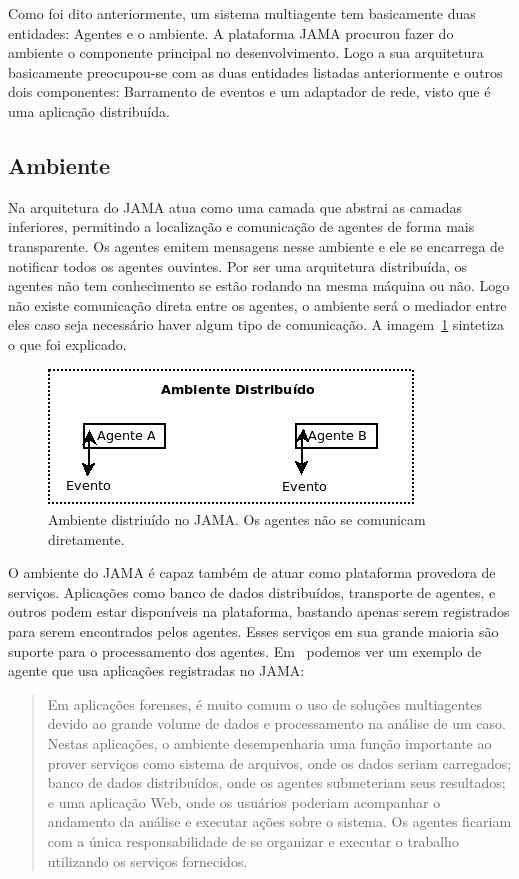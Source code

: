 Como foi dito anteriormente, um sistema multiagente tem basicamente duas entidades: Agentes e o ambiente. A plataforma JAMA procurou fazer do ambiente o componente principal no desenvolvimento. Logo a sua arquitetura basicamente preocupou-se com as duas entidades listadas anteriormente e outros dois componentes: Barramento de eventos e um adaptador de rede, visto que é uma aplicação distribuída.

\subsection{Ambiente}

Na arquitetura do JAMA atua como uma camada que abstrai as camadas inferiores, permitindo a localização e comunicação de agentes de forma mais transparente. Os agentes emitem mensagens nesse ambiente e ele se encarrega de notificar todos os agentes ouvintes. Por ser uma arquitetura distribuída, os agentes não tem conhecimento se estão rodando na mesma máquina ou não. Logo não existe comunicação direta entre os agentes, o ambiente será o mediador entre eles caso seja necessário haver algum tipo de comunicação. A imagem~\ref{fig:ambiente} sintetiza o que foi explicado.

\begin{figure}
	\centering
	\includegraphics[scale=0.75]{images/ambiente.png}
	\caption{Ambiente distriuído no JAMA. Os agentes não se comunicam diretamente.}
	\label{fig:ambiente}
\end{figure}

O ambiente do JAMA é capaz também de atuar como plataforma provedora de serviços. Aplicações como banco de dados distribuídos, transporte de agentes, e outros podem estar disponíveis na plataforma, bastando apenas serem registrados para serem encontrados pelos agentes. Esses serviços em sua grande maioria são suporte para o processamento dos agentes. Em~\cite{parise11} podemos ver um exemplo de agente que usa aplicações registradas no JAMA:

\begin{quote}
Em aplicações forenses, é muito comum o uso de soluções multiagentes devido ao grande volume de dados e processamento na análise de um caso. Nestas aplicações, o ambiente desempenharia uma função importante ao prover serviços como sistema de arquivos, onde os dados seriam carregados; banco de dados distribuídos, onde os agentes submeteriam seus resultados; e uma aplicação Web, onde os usuários poderiam acompanhar o andamento da análise e executar ações sobre o sistema. Os agentes ficariam com a única responsabilidade de se organizar e executar o trabalho utilizando os serviços fornecidos.
\end{quote}

